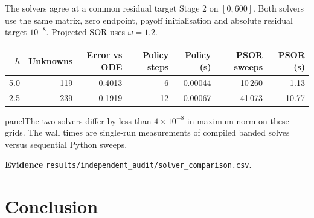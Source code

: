 \documentclass[aspectratio=169,11pt]{beamer}
\newcommand{\panel}[1]{%
  \begin{beamercolorbox}[wd=\linewidth,sep=2.2mm]{panel}#1\end{beamercolorbox}}
\newcommand{\sourcefile}[1]{\par\vfill{\scriptsize\color{Muted}#1\par}}
\begin{document}
\begin{frame}[t]{The solvers agree at a common residual target}
  Stage 2 on $[0,600]$. Both solvers use the same matrix, zero endpoint,
  payoff initialisation and absolute residual target $10^{-8}$.
  Projected SOR uses $\omega=1.2$.
  \medskip
  \begin{center}
    \renewcommand{\arraystretch}{1.23}
    \begin{tabular}{@{}rrrrrrr@{}}
      \toprule
      $h$ & Unknowns & Error vs ODE & Policy steps & Policy (s) & PSOR sweeps & PSOR (s) \\
      \midrule
      5.0 & 119 & 0.4013 & 6 & 0.00044 & 10\,260 & 1.13 \\
      2.5 & 239 & 0.1919 & 12 & 0.00067 & 41\,073 & 10.77 \\
      \bottomrule
    \end{tabular}
  \end{center}
  \panel{The two solvers differ by less than $4\times10^{-8}$ in maximum norm
    on these grids. The wall times are single-run measurements of compiled banded
    solves versus sequential Python sweeps.}
  \sourcefile{\textbf{Evidence} \enspace \texttt{results/independent\_audit/solver\_comparison.csv}.}
\end{frame}

\section{Conclusion}
\end{document}

